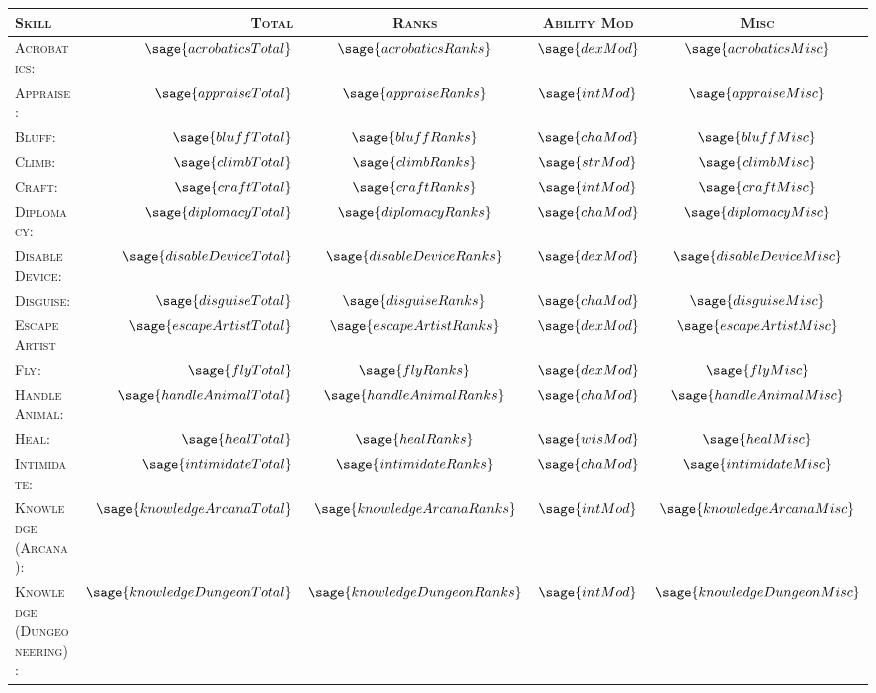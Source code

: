 \documentclass[10pt]{article}
\begin{document}
	\begin{tabular}{l r c c c}
		\textsc{Skill} & \textsc{Total} & \textsc{Ranks} & \textsc{Ability Mod} & \textsc{Misc} \\
		\hline
		\textsc{Acrobatics:} & \(\sage{acrobaticsTotal}\) & \(\sage{acrobaticsRanks}\) & \(\sage{dexMod}\) & \(\sage{acrobaticsMisc}\) \\
		\textsc{Appraise:} & \(\sage{appraiseTotal}\) & \(\sage{appraiseRanks}\) & \(\sage{intMod}\) & \(\sage{appraiseMisc}\) \\
		\textsc{Bluff:} & \(\sage{bluffTotal}\) & \(\sage{bluffRanks}\) & \(\sage{chaMod}\) & \(\sage{bluffMisc}\) \\
		\textsc{Climb:} & \(\sage{climbTotal}\) & \(\sage{climbRanks}\) & \(\sage{strMod}\) & \(\sage{climbMisc}\) \\
		\textsc{Craft:} & \(\sage{craftTotal}\) & \(\sage{craftRanks}\) & \(\sage{intMod}\) & \(\sage{craftMisc}\) \\
		\textsc{Diplomacy:} & \(\sage{diplomacyTotal}\) & \(\sage{diplomacyRanks}\) & \(\sage{chaMod}\) & \(\sage{diplomacyMisc}\) \\
		\textsc{Disable Device:} & \(\sage{disableDeviceTotal}\) & \(\sage{disableDeviceRanks}\) & \(\sage{dexMod}\) & \(\sage{disableDeviceMisc}\) \\
		\textsc{Disguise:} & \(\sage{disguiseTotal}\) & \(\sage{disguiseRanks}\) & \(\sage{chaMod}\) & \(\sage{disguiseMisc}\) \\
		\textsc{Escape Artist} & \(\sage{escapeArtistTotal}\) & \(\sage{escapeArtistRanks}\) & \(\sage{dexMod}\) & \(\sage{escapeArtistMisc}\) \\
		\textsc{Fly:} & \(\sage{flyTotal}\) & \(\sage{flyRanks}\) & \(\sage{dexMod}\) & \(\sage{flyMisc}\) \\
		\textsc{Handle Animal:} & \(\sage{handleAnimalTotal}\) & \(\sage{handleAnimalRanks}\) & \(\sage{chaMod}\) & \(\sage{handleAnimalMisc}\) \\
		\textsc{Heal:} & \(\sage{healTotal}\) & \(\sage{healRanks}\) & \(\sage{wisMod}\) & \(\sage{healMisc}\) \\
		\textsc{Intimidate:} & \(\sage{intimidateTotal}\) & \(\sage{intimidateRanks}\) & \(\sage{chaMod}\) & \(\sage{intimidateMisc}\) \\
		\textsc{Knowledge (Arcana):} & \(\sage{knowledgeArcanaTotal}\) & \(\sage{knowledgeArcanaRanks}\) & \(\sage{intMod}\) & \(\sage{knowledgeArcanaMisc}\)\\
		\textsc{Knowledge (Dungeoneering):} & \(\sage{knowledgeDungeonTotal}\) & \(\sage{knowledgeDungeonRanks}\) & \(\sage{intMod}\) & \(\sage{knowledgeDungeonMisc}\)\\

\end{tabular}
\end{document}
